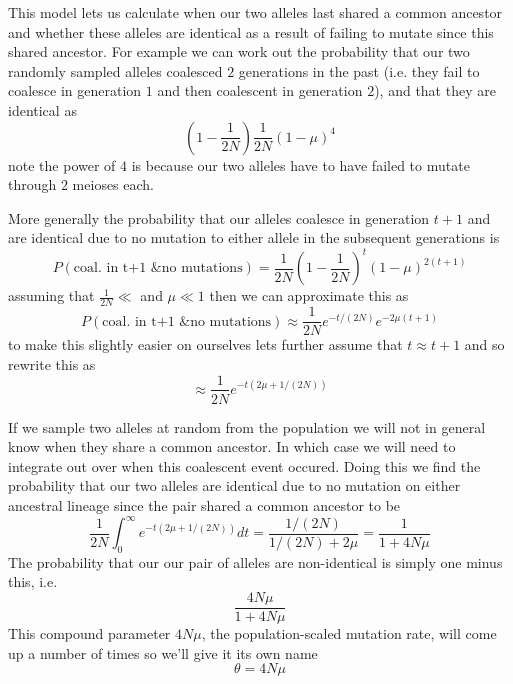 This model lets us calculate when our two alleles last shared a common
ancestor and whether these alleles are identical as a result of
failing to mutate since this shared ancestor.  For example we can work out the probability that our
two randomly sampled alleles coalesced $2$ generations in the past
(i.e. they fail to coalesce in generation $1$ and then coalescent in
generation $2$), and
that they are identical as
\begin{equation}
\left(1- \frac{1}{2N} \right) \frac{1}{2N} (1-\mu)^4
\end{equation}
note the power of $4$ is because our two alleles have to have failed
to mutate through $2$ meioses each.

More generally the probability that our alleles coalesce in generation
$t+1$ and are identical due to no mutation to either allele in the
subsequent generations is
\begin{equation}
P(\textrm{coal. in t+1 \& no mutations}) =  \frac{1}{2N} \left(1- \frac{1}{2N} \right)^t \left(1-\mu \right)^{2(t+1)}
\end{equation}
assuming that $\frac{1}{2N} \ll$ and $\mu \ll 1$ then we can
approximate this as
\begin{equation}
P(\textrm{coal. in t+1 \& no mutations}) \approx  \frac{1}{2N}
e^{-t/(2N)} e^{-2\mu (t+1)}
\end{equation}
to make this slightly easier on ourselves lets further assume that $t
\approx t+1$ and so rewrite this as
\begin{equation}
\approx \frac{1}{2N} e^{-t(2\mu+1/(2N))}
\end{equation}

If we sample two alleles at random from the population we will not in
general know when they share a common ancestor. In which case we will
need to integrate out over when this coalescent event occured. Doing
this we find the probability that our two alleles are identical due to
no mutation on either ancestral lineage since the pair shared a common
ancestor to be
\begin{equation}
\frac{1}{2N} \int_0^{\infty} e^{-t(2\mu+1/(2N))} dt =
\frac{1/(2N)}{1/(2N)+2\mu} = \frac{1}{1+4N\mu}
\end{equation}
The probability that our our pair of alleles are non-identical is
simply one minus this, i.e.
\begin{equation}
\frac{4N\mu}{1+4N\mu} \label{eqn:hetero}
\end{equation}
This compound parameter $4N\mu$, the population-scaled mutation rate,
will come up a number of times so we'll give it its own name
\begin{equation}
\theta = 4N\mu
\end{equation}

